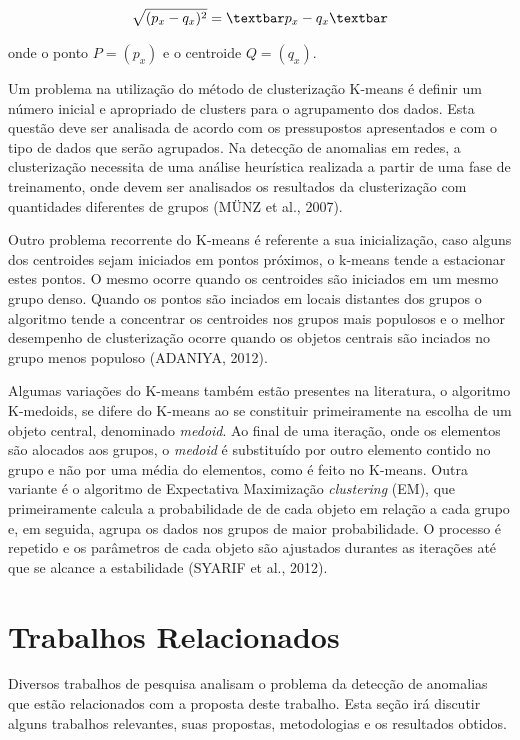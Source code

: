 \begin{equation}
\label{eq:Distância Euclidiana} %
\sqrt{(p_{x} - q_{x})^{2}} = \textbar p_{x} - q_{x} \textbar
\end{equation}

\noindent onde o ponto $P = (p_{x})$ e o centroide $Q = (q_{x})$.

\indent Um problema na utilização do método de clusterização K-means é definir um número inicial e  apropriado de clusters para o agrupamento dos dados. Esta questão deve ser analisada de acordo com os pressupostos apresentados e com o tipo de dados que serão agrupados. Na detecção de anomalias em redes, a clusterização necessita de uma análise heurística realizada a partir de uma fase de treinamento, onde devem ser analisados os resultados da clusterização com quantidades diferentes de grupos (MÜNZ et al., 2007).

\indent Outro problema recorrente do K-means é referente a sua inicialização, caso alguns dos centroides sejam iniciados em pontos próximos, o k-means tende a estacionar estes pontos. O mesmo ocorre quando os centroides são iniciados em um mesmo grupo denso. Quando os pontos são inciados em locais distantes dos grupos o algoritmo tende a concentrar os centroides nos grupos mais populosos e o melhor desempenho de clusterização ocorre quando os objetos centrais são inciados no grupo menos populoso (ADANIYA, 2012).

\indent Algumas variações do K-means também estão presentes na literatura, o algoritmo K-medoids, se difere do K-means ao se constituir primeiramente na escolha de um objeto central, denominado \textit{medoid}. Ao final de uma iteração, onde os elementos são alocados aos grupos, o \textit{medoid} é substituído por outro elemento contido no grupo e não por uma média do elementos, como é feito no K-means. Outra variante é o algoritmo de Expectativa Maximização \textit{clustering} (EM), que primeiramente calcula a probabilidade de de cada objeto em relação a cada grupo e, em seguida, agrupa os dados nos grupos de maior probabilidade. O processo é repetido e os parâmetros de cada objeto são ajustados durantes as iterações até que se alcance a estabilidade (SYARIF et al., 2012).

  \section{Trabalhos Relacionados}

\indent Diversos trabalhos de pesquisa analisam o problema da detecção de anomalias que estão relacionados com a proposta deste trabalho. Esta seção irá discutir alguns trabalhos relevantes, suas propostas, metodologias e os resultados obtidos.

